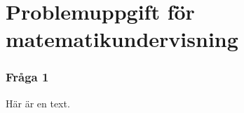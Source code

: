 \part*{Problemuppgift för matematikundervisning}


\setcounter{section}{0}
\section{Fråga 1}
Här är en text.
